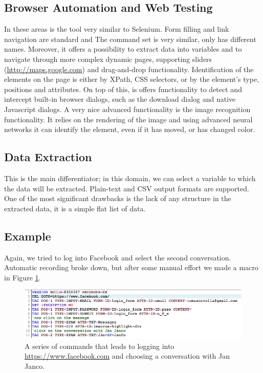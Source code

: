 \subsection{Browser Automation and Web Testing}
In these areas is the tool very similar to Selenium. Form filling and link navigation are standard and 
The command set is very similar, only has different names.
Moreover, it offers a possibility to extract data into variables and to navigate through more complex dynamic pages, supporting sliders (\url{http://maps.google.com}) and drag-and-drop functionality.
Identification of the elements on the page is either by XPath, CSS selectors, or by the element's type, positions and attributes. On top of this, is offers functionality to detect and intercept built-in browser dialogs, such as the download dialog and native Javascript dialogs. A very nice advanced functionality is the image recognition functionality. It relies on the rendering of the image and using advanced neural networks it can identify the element, even if it has moved, or has changed color.

\subsection{Data Extraction}
This is the main differentiator; in this domain, we can select a variable to which the data will be extracted. Plain-text and CSV output formats are supported.
One of the most significant drawbacks is the lack of any structure in the extracted data, it is a simple flat list of data.

\subsection{Example}
Again, we tried to log into Facebook and select the second conversation. Automatic recording broke down, but after some manual effort we made a macro in Figure \ref{fig:iMacrosCommands}.
\begin{figure}
    \centering
    \includegraphics[width=\textwidth]{../img/iMacrosCommands}
    \caption{A series of commands that leads to logging into \url{https://www.facebook.com} and choosing a conversation with Jan Janco.}
    \label{fig:iMacrosCommands}
\end{figure}


